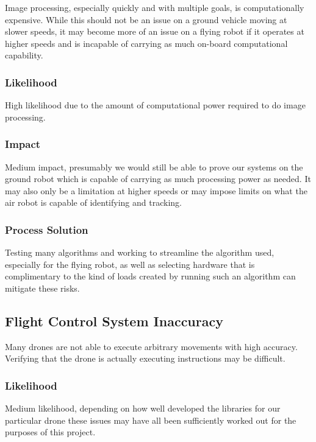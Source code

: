 \documentclass{article}
\begin{document}
	Image processing, especially quickly and with multiple goals, is computationally expensive. While this should not be an issue on a ground vehicle moving at slower speeds, it may become more of an issue on a flying robot if it operates at higher speeds and is incapable of carrying as much on-board computational capability.
	
		\subsubsection{Likelihood}

		High likelihood due to the amount of computational power required to do image processing. 
		
		\subsubsection{Impact}
		
		Medium impact, presumably we would still be able to prove our systems on the ground robot which is capable of carrying as much processing power as needed. It may also only be a limitation at higher speeds or may impose limits on what the air robot is capable of identifying and tracking. 
		
		\subsubsection{Process Solution}
		
		Testing many algorithms and working to streamline the algorithm used, especially for the flying robot, as well as selecting hardware that is complimentary to the kind of loads created by running such an algorithm can mitigate these risks. 
	
	\subsection{Flight Control System Inaccuracy}
	
	Many drones are not able to execute arbitrary movements with high accuracy. Verifying that the drone is actually executing instructions may be difficult. 
	
		\subsubsection{Likelihood}
		
		Medium likelihood, depending on how well developed the libraries for our particular drone these issues may have all been sufficiently worked out for the purposes of this project.
		
\end{document}
